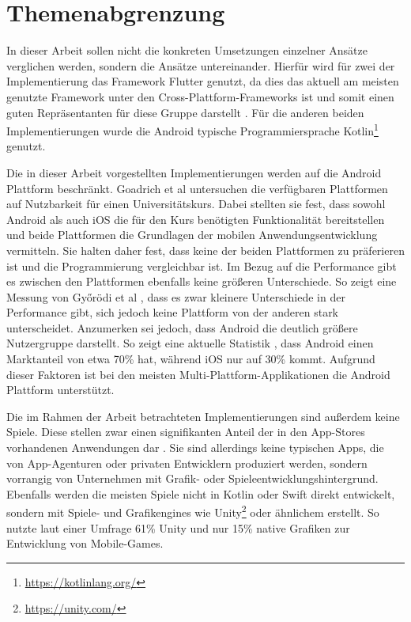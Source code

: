 \section{Themenabgrenzung}
\label{cha:3_3abgrenzung}
In dieser Arbeit sollen nicht die konkreten Umsetzungen einzelner Ansätze verglichen werden, sondern die Ansätze untereinander. Hierfür wird für zwei der Implementierung das Framework Flutter genutzt, da dies das aktuell am meisten genutzte Framework unter den Cross-Plattform-Frameworks ist und somit einen guten Repräsentanten für diese Gruppe darstellt \cite{statist_CP_Framework}. Für die anderen beiden Implementierungen wurde die Android typische Programmiersprache Kotlin\footnote{\url{https://kotlinlang.org/}} genutzt. 

Die in dieser Arbeit vorgestellten Implementierungen werden auf die Android Plattform beschränkt. 
Goadrich et al \cite{iOSvsAndroid} untersuchen die verfügbaren Plattformen auf Nutzbarkeit für einen Universitätskurs. 
Dabei stellten sie fest, dass sowohl Android als auch iOS die für den Kurs benötigten Funktionalität bereitstellen und beide Plattformen die Grundlagen der mobilen Anwendungsentwicklung vermitteln. Sie halten daher fest, dass keine der beiden Plattformen zu präferieren ist und die Programmierung vergleichbar ist.
Im Bezug auf die Performance gibt es zwischen den Plattformen ebenfalls keine größeren Unterschiede. So zeigt eine Messung von Győrödi et al \cite{Android_IOS_Performance_comparison}, dass es zwar kleinere Unterschiede in der Performance gibt, sich jedoch keine Plattform von der anderen stark unterscheidet.
Anzumerken sei jedoch, dass Android die deutlich größere Nutzergruppe darstellt. So zeigt eine aktuelle Statistik \cite{statist_OS_worldwide}, dass Android einen Marktanteil von etwa 70\% hat, während iOS nur auf 30\% kommt. Aufgrund dieser Faktoren ist bei den meisten Multi-Plattform-Applikationen die Android Plattform unterstützt.

Die im Rahmen der Arbeit betrachteten Implementierungen sind außerdem keine Spiele. Diese stellen zwar einen signifikanten Anteil der in den App-Stores vorhandenen Anwendungen dar \cite{statist_games_appstore}. Sie sind allerdings keine typischen Apps, die von App-Agenturen oder privaten Entwicklern produziert werden, sondern vorrangig von Unternehmen mit Grafik- oder Spieleentwicklungshintergrund. Ebenfalls werden die meisten Spiele nicht in Kotlin oder Swift direkt entwickelt, sondern mit Spiele- und Grafikengines wie Unity\footnote{\url{https://unity.com/}} oder ähnlichem erstellt. So nutzte laut einer Umfrage \cite{unity_percantage_game_enginge} 61\% Unity und nur 15\% native Grafiken zur Entwicklung von Mobile-Games.

